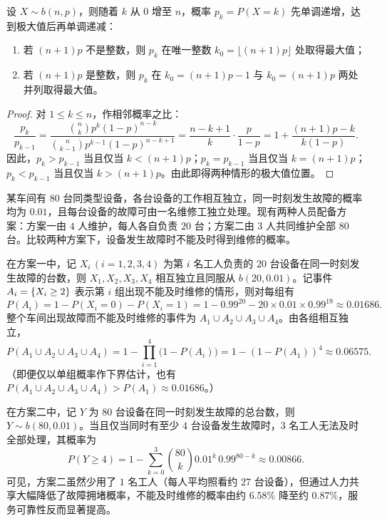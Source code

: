 \begin{proposition}[二项分布的最可能次数]
\label{prop:binomial-mode}
设 $X\sim b(n,p)$，则随着 $k$ 从 $0$ 增至 $n$，概率 $p_k=P(X=k)$ 先单调递增，达到极大值后再单调递减：
\begin{enumerate}
  \item 若 $(n+1)p$ 不是整数，则 $p_k$ 在唯一整数 $k_0=\lfloor (n+1)p\rfloor$ 处取得最大值；
  \item 若 $(n+1)p$ 是整数，则 $p_k$ 在 $k_0=(n+1)p-1$ 与 $k_0=(n+1)p$ 两处并列取得最大值。
\end{enumerate}
\end{proposition}
\begin{proof}
对 $1\le k\le n$，作相邻概率之比：
\[
  \frac{p_k}{p_{k-1}}
  =\frac{\binom{n}{k}p^k(1-p)^{n-k}}{\binom{n}{k-1}p^{k-1}(1-p)^{n-k+1}}
  =\frac{n-k+1}{k}\cdot\frac{p}{1-p}
  =1+\frac{(n+1)p-k}{k(1-p)}.
\]
因此，$p_k>p_{k-1}$ 当且仅当 $k<(n+1)p$；$p_k=p_{k-1}$ 当且仅当 $k=(n+1)p$；$p_k<p_{k-1}$ 当且仅当 $k>(n+1)p$。由此即得两种情形的极大值位置。
\end{proof}

\begin{example}[title={分组维修与集中维修方案比较}]
\label{eg:maintenance-pooling}
某车间有 $80$ 台同类型设备，各台设备的工作相互独立，同一时刻发生故障的概率均为 $0.01$，且每台设备的故障可由一名维修工独立处理。现有两种人员配备方案：方案一由 $4$ 人维护，每人各自负责 $20$ 台；方案二由 $3$ 人共同维护全部 $80$ 台。比较两种方案下，设备发生故障时不能及时得到维修的概率。
\begin{solution}
在方案一中，记 $X_i\,(i=1,2,3,4)$ 为第 $i$ 名工人负责的 $20$ 台设备在同一时刻发生故障的台数，则 $X_1,X_2,X_3,X_4$ 相互独立且同服从 $b(20,0.01)$。记事件 $A_i=\{X_i\ge 2\}$ 表示第 $i$ 组出现不能及时维修的情形，则对每组有
\[
  P(A_i)=1-P(X_i=0)-P(X_i=1)
  =1-0.99^{20}-20\times 0.01\times 0.99^{19}\approx 0.01686.
\]
整个车间出现故障而不能及时维修的事件为 $A_1\cup A_2\cup A_3\cup A_4$。由各组相互独立，
\[
  P(A_1\cup A_2\cup A_3\cup A_4)
  =1-\prod_{i=1}^{4}\bigl(1-P(A_i)\bigr)
  =1-(1-P(A_1))^4\approx 0.06575.
\]
（即便仅以单组概率作下界估计，也有 $P(A_1\cup A_2\cup A_3\cup A_4)>P(A_1)\approx 0.01686$。）

在方案二中，记 $Y$ 为 $80$ 台设备在同一时刻发生故障的总台数，则 $Y\sim b(80,0.01)$。当且仅当同时有至少 $4$ 台设备发生故障时，$3$ 名工人无法及时全部处理，其概率为
\[
  P(Y\ge 4)=1-\sum_{k=0}^{3}\binom{80}{k}0.01^k\,0.99^{80-k}\approx 0.00866.
\]
可见，方案二虽然少用了 $1$ 名工人（每人平均照看约 $27$ 台设备），但通过人力共享大幅降低了故障拥堵概率，不能及时维修的概率由约 $6.58\%$ 降至约 $0.87\%$，服务可靠性反而显著提高。
\end{solution}
\end{example}

